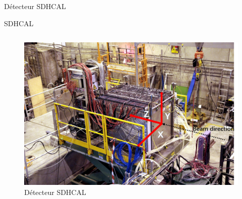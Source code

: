 \documentclass[9pt]{beamer}
\begin{document}
\begin{frame}{Détecteur SDHCAL}
\begin{block}{SDHCAL}
\begin{columns}
            \begin{column}{0.45\textwidth}
                \begin{figure}
                    \center
                    \includegraphics[width=\textwidth]{../img/SDHCAL.png}
                    \caption{Détecteur SDHCAL}
                    \label{detector}
                \end{figure}
            \end{column}
        \end{columns}
    \end{block}
\end{frame}

\end{document}
